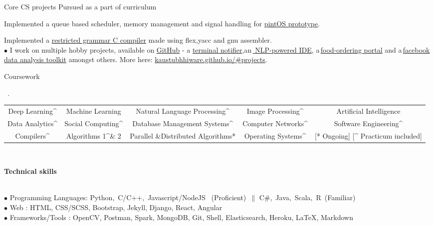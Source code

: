 \documentclass[11pt, a4paper]{resume}
\newcommand{\important}[1]{
	\textcolor{mypurple}{#1}
}
\newcommand{\fillit}[1]{
	\leavevmode\xleaders\hbox{#1}\hfill\kern0pt
}
\newcommand{\sectionTitle}[1]{
	\begin{Large}
    	\important{\textbf{#1}} 
    \end{Large}
    \important{\rlap{\rule[.5ex]{\linegoal}{0.5pt}}{}}
     \vspace{0.1em}\\
}
\newcommand{\sectionSubtitleX}[1]{
	\begin{large}
    \important{#1}
    \end{large}
    \fillit{\important{.}}
}
\begin{document}
\begin{rSubsection}{Core CS projects}{\hspace*{\fill} Pursued as a part of curriculum}{}{}
\item Implemented a queue based scheduler, memory management and signal handling for \href{https://github.com/kaustubhhiware/OSLab}{pintOS prototype}.
\item Implemented a \href{https://github.com/kaustubhhiware/cOMPILER}{restricted grammar C compiler} made using flex,yacc and gnu assembler.\\
$\bullet$ I work on multiple hobby projects, available on \href{https://github.com/kaustubhhiware}{GitHub} - a \href{https://github.com/kaustubhhiware/ NotiFyre}{terminal notifier},an\,\href{https://github.com/kaustubhhiware/c0derunR}{ NLP-powered IDE}, a\,\href{https://github.com/kaustubhhiware/Foodspark}{food-ordering portal} and a\,\href{https://github.com/kaustubhhiware/facebook-archive}{facebook data analysis toolkit} amongst others. More here: \href{https://kaustubhhiware.github.io/#projects}{kaustubhhiware.github.io/\#projects}.
\end{rSubsection}

\sectionSubtitleX{Coursework} 
\begin{tabular}{>{\footnotesize}c>{\footnotesize}c>{\footnotesize}c>{\footnotesize}c>{\footnotesize}c}
Deep Learning\textasciicircum & Machine Learning & Natural Language Processing\textasciicircum & Image Processing\*\textasciicircum & Artificial Intelligence \\
Data Analytics\textasciicircum & Social Computing\textasciicircum & Database Management Systems\textasciicircum & Computer Networks\textasciicircum & Software Engineering\textasciicircum \\
Compilers\textasciicircum & Algorithms 1\textasciicircum \& 2 & Parallel \&Distributed Algorithms* & Operating Systems\textasciicircum & {\scriptsize [* Ongoing]\,\,[\textasciicircum \,\,Practicum included]} \\
\end{tabular}\\

\sectionTitle{Technical skills}
$\bullet$ Programming Languages: Python,\, C/C++,\, Javascript/NodeJS \, (Proficient)\, $\|$ C\#,\, Java,\, Scala,\, R\, (Familiar) \\
$\bullet$ Web : HTML, CSS/SCSS, Bootstrap, Jekyll, Django, React, Angular \\
$\bullet$  Frameworks/Tools
: OpenCV, Postman, Spark, MongoDB, Git, Shell, Elasticsearch, Heroku, LaTeX, Markdown
\end{document}
